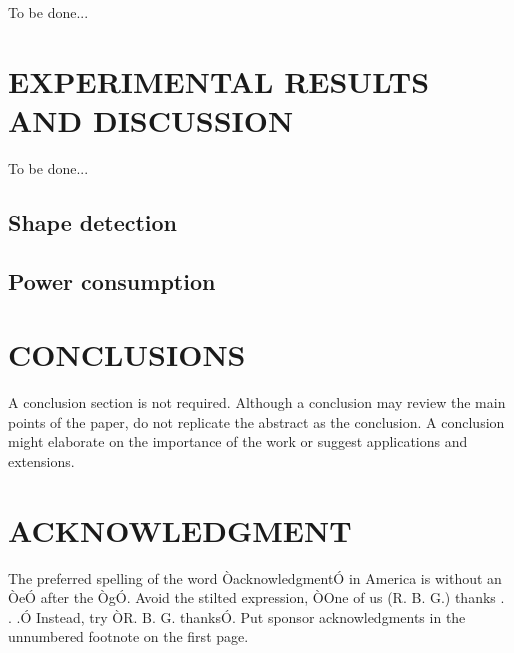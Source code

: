 \documentclass[letterpaper, 10 pt, conference]{ieeeconf}  %
\begin{document}
To be done...

\section{EXPERIMENTAL RESULTS AND DISCUSSION}

To be done...

\subsection{Shape detection}

\subsection{Power consumption}

\section{CONCLUSIONS}

A conclusion section is not required. Although a conclusion may review the main points of the paper, do not replicate the abstract as the conclusion. A conclusion might elaborate on the importance of the work or suggest applications and extensions. 

\addtolength{\textheight}{-12cm}   %





\section*{ACKNOWLEDGMENT}

The preferred spelling of the word ÒacknowledgmentÓ in America is without an ÒeÓ after the ÒgÓ. Avoid the stilted expression, ÒOne of us (R. B. G.) thanks . . .Ó  Instead, try ÒR. B. G. thanksÓ. Put sponsor acknowledgments in the unnumbered footnote on the first page.
\end{document}
